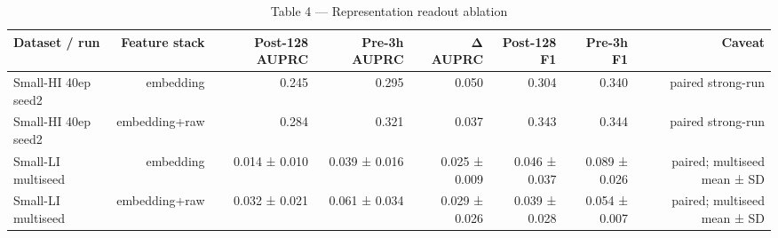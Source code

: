 \begin{table}[t]
\centering
\caption{Table 4 — Representation readout ablation}
\begin{tabular}{lrrrrrrr}
\toprule
Dataset / run & Feature stack & Post-128 AUPRC & Pre-3h AUPRC & Δ AUPRC & Post-128 F1 & Pre-3h F1 & Caveat \\
\midrule
Small-HI 40ep seed2 & embedding & 0.245 & 0.295 & 0.050 & 0.304 & 0.340 & paired strong-run \\
Small-HI 40ep seed2 & embedding+raw & 0.284 & 0.321 & 0.037 & 0.343 & 0.344 & paired strong-run \\
Small-LI multiseed & embedding & 0.014 ± 0.010 & 0.039 ± 0.016 & 0.025 ± 0.009 & 0.046 ± 0.037 & 0.089 ± 0.026 & paired; multiseed mean ± SD \\
Small-LI multiseed & embedding+raw & 0.032 ± 0.021 & 0.061 ± 0.034 & 0.029 ± 0.026 & 0.039 ± 0.028 & 0.054 ± 0.007 & paired; multiseed mean ± SD \\
\bottomrule
\end{tabular}
\end{table}
